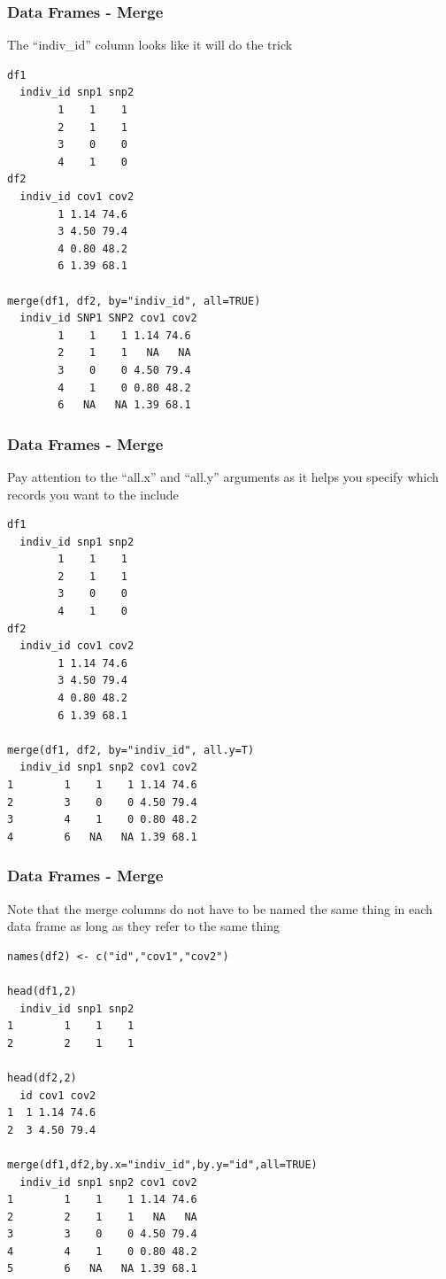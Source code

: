 \documentclass{beamer}
\begin{document}
\begin{frame}[fragile]
\frametitle{Data Frames - Merge}
The ``indiv\_id'' column looks like it will do the trick
\footnotesize
\begin{verbatim}
df1
  indiv_id snp1 snp2
        1    1    1
        2    1    1
        3    0    0
        4    1    0
df2
  indiv_id cov1 cov2
        1 1.14 74.6
        3 4.50 79.4
        4 0.80 48.2
        6 1.39 68.1

merge(df1, df2, by="indiv_id", all=TRUE)
  indiv_id SNP1 SNP2 cov1 cov2
        1    1    1 1.14 74.6
        2    1    1   NA   NA
        3    0    0 4.50 79.4
        4    1    0 0.80 48.2
        6   NA   NA 1.39 68.1
\end{verbatim}
\end{frame}


\begin{frame}[fragile]
\frametitle{Data Frames - Merge}
Pay attention to the ``all.x'' and ``all.y'' arguments as it helps you specify which records you want to the include 
\footnotesize
\begin{verbatim}
df1
  indiv_id snp1 snp2
        1    1    1
        2    1    1
        3    0    0
        4    1    0
df2
  indiv_id cov1 cov2
        1 1.14 74.6
        3 4.50 79.4
        4 0.80 48.2
        6 1.39 68.1

merge(df1, df2, by="indiv_id", all.y=T)
  indiv_id snp1 snp2 cov1 cov2
1        1    1    1 1.14 74.6
2        3    0    0 4.50 79.4
3        4    1    0 0.80 48.2
4        6   NA   NA 1.39 68.1
\end{verbatim}
\end{frame}

\begin{frame}[fragile]
\frametitle{Data Frames - Merge}
Note that the merge columns do not have to be named the same thing in each data frame as long as they refer to the same thing
\footnotesize
\begin{verbatim}
names(df2) <- c("id","cov1","cov2")

head(df1,2)
  indiv_id snp1 snp2
1        1    1    1
2        2    1    1

head(df2,2) 
  id cov1 cov2
1  1 1.14 74.6
2  3 4.50 79.4

merge(df1,df2,by.x="indiv_id",by.y="id",all=TRUE)
  indiv_id snp1 snp2 cov1 cov2
1        1    1    1 1.14 74.6
2        2    1    1   NA   NA
3        3    0    0 4.50 79.4
4        4    1    0 0.80 48.2
5        6   NA   NA 1.39 68.1
\end{verbatim}
\end{frame}
\end{document}
